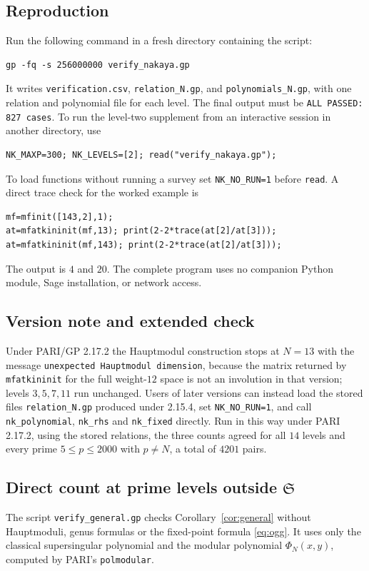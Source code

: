 \documentclass[11pt,a4paper]{article}
\theoremstyle{remark}\newtheorem{remark}[theorem]{Remark}
\numberwithin{equation}{section}
\begin{document}
\subsection{Reproduction}
Run the following command in a fresh directory containing the script:
\begin{lstlisting}
gp -fq -s 256000000 verify_nakaya.gp
\end{lstlisting}
It writes \texttt{verification.csv}, \texttt{relation\_N.gp}, and \texttt{polynomials\_N.gp}, with one relation and polynomial file for each level. The final output must be \texttt{ALL PASSED: 827 cases}. To run the level-two supplement from an interactive session in another directory, use
\begin{lstlisting}
NK_MAXP=300; NK_LEVELS=[2]; read("verify_nakaya.gp");
\end{lstlisting}
To load functions without running a survey set \texttt{NK\_NO\_RUN=1} before \texttt{read}. A direct trace check for the worked example is
\begin{lstlisting}
mf=mfinit([143,2],1);
at=mfatkininit(mf,13); print(2-2*trace(at[2]/at[3]));
at=mfatkininit(mf,143); print(2-2*trace(at[2]/at[3]));
\end{lstlisting}
The output is $4$ and $20$. The complete program uses no companion Python module, Sage installation, or network access.

\subsection{Version note and extended check}
Under PARI/GP 2.17.2 the Hauptmodul construction stops at $N=13$ with the message \texttt{unexpected Hauptmodul dimension}, because the matrix returned by \texttt{mfatkininit} for the full weight-$12$ space is not an involution in that version; levels $3,5,7,11$ run unchanged. Users of later versions can instead load the stored files \texttt{relation\_N.gp} produced under 2.15.4, set \texttt{NK\_NO\_RUN=1}, and call \texttt{nk\_polynomial}, \texttt{nk\_rhs} and \texttt{nk\_fixed} directly. Run in this way under PARI 2.17.2, using the stored relations, the three counts agreed for all $14$ levels and every prime $5\leq p\leq2000$ with $p\neq N$, a total of $4201$ pairs.

\subsection{Direct count at prime levels outside \texorpdfstring{$\mathfrak S$}{S}}\label{app:general}
The script \texttt{verify\_general.gp} checks Corollary~\ref{cor:general} without Hauptmoduli, genus formulas or the fixed-point formula \eqref{eq:ogg}. It uses only the classical supersingular polynomial and the modular polynomial $\Phi_N(x,y)$, computed by PARI's \texttt{polmodular}.
\end{document}
